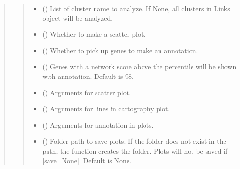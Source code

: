 \documentclass[letterpaper,10pt,english]{sphinxmanual}
\begin{document}
\begin{quote}
\begin{fulllineitems}
\begin{fulllineitems}
\begin{quote}
\begin{description}
\begin{itemize}
\item {} 
 () \textendash{} List of cluster name to analyze. If None, all clusters in Links object will be analyzed.

\item {} 
 () \textendash{} Whether to make a scatter plot.

\item {} 
 () \textendash{} Whether to pick up genes to make an annotation.

\item {} 
 () \textendash{} Genes with a network score above the percentile will be shown with annotation. Default is 98.

\item {} 
 () \textendash{} Arguments for scatter plot.

\item {} 
 () \textendash{} Arguments for lines in cartography plot.

\item {} 
 () \textendash{} Arguments for annotation in plots.

\item {} 
 () \textendash{} Folder path to save plots. If the folder does not exist in the path, the function creates the folder.
Plots will not be saved if {[}save=None{]}. Default is None.

\end{itemize}

\end{description}\end{quote}

\end{fulllineitems}



\end{fulllineitems}
\end{quote}
\end{document}
